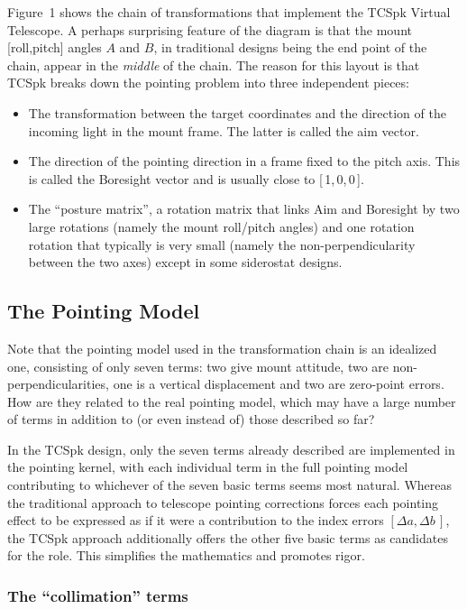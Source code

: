 \documentclass[12pt,fleqn,twoside]{article}
\renewcommand{\_}{{\tt\char'137}}     %
\newcommand{\dab}        {$[\Delta a,\Delta b\,]$}
\begin{document}
Figure~1 shows the chain of transformations that implement the
TCSpk Virtual Telescope.  A perhaps surprising feature of the diagram
is that the mount [roll,pitch] angles $A$ and $B$, in
traditional designs being the end point of the chain,
appear in the {\it middle}\/
of the chain.  The reason for this layout is that TCSpk
breaks down the pointing problem into three independent pieces:
\begin{itemize}
\item The transformation between the target coordinates and the
direction of the incoming light in the mount frame.
The latter is called the aim vector.

\item The direction of the pointing direction in a frame fixed to
the pitch axis. This is called the {\sc Boresight} vector and is
usually close to [\,1,\,0,\,0\,].

\item The ``posture matrix'', a rotation matrix that links {\sc Aim}
and {\sc Boresight} by two large rotations (namely the mount roll/pitch
angles) and one rotation rotation that typically is very
small (namely the non-perpendicularity between the two axes) except
in some siderostat designs.
\end{itemize}

\subsection{The Pointing Model}

Note that the pointing model used in the transformation chain is
an idealized one, consisting of only seven terms: two give mount
attitude, two are non-perpendicularities, one is a vertical
displacement and two are zero-point errors.  How are they related
to the real pointing model, which may have a large number of terms
in addition to (or even instead of) those described so far?

In the TCSpk design, only the seven terms already described are
implemented in the pointing kernel, with each individual term in
the full pointing model contributing to whichever of the seven
basic terms seems most natural.  Whereas the traditional approach
to telescope pointing corrections
forces each pointing effect to be expressed as if it were
a contribution to the index errors \dab , the TCSpk approach
additionally offers the other five basic terms as candidates for
the role.  This simplifies the mathematics and promotes rigor.

\subsubsection{The ``collimation'' terms}
\end{document}
